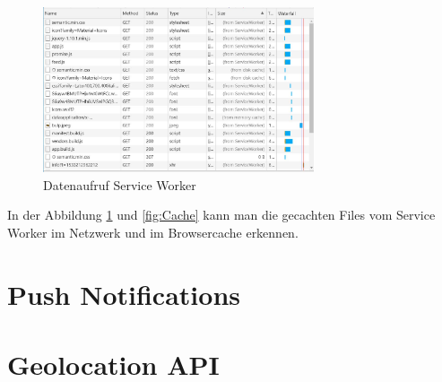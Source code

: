 \begin{figure}[h]
	\centering
	\includegraphics[width=8cm]{BilderAllgemein/Implementierung/aufruf_SW_Browser.jpg}\medskip
	\caption{Datenaufruf Service Worker}
	\label{fig:aufrufSWBrowser}
\end{figure}  

In der Abbildung \ref{fig:aufrufSWBrowser} und \ref{fig:Cache} kann man die gecachten Files vom Service Worker im Netzwerk und im Browsercache erkennen.

\section{Push Notifications}


\section{Geolocation API}











